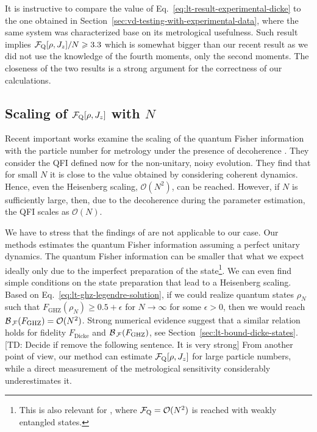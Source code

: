 It is instructive to compare the value of Eq.~\eqref{eq:lt-result-experimental-dicke} to the one obtained in Section~\ref{sec:vd-testing-with-experimental-data}, where the same system was characterized base on its metrological usefulness.
Such result implies $\mathcal{F}_{\textnormal{Q}}[{\textstyle \rho,J_z}]/N\geqslant3.3$ which is somewhat bigger than our recent result as we did not use the knowledge of the fourth moments, only the second moments.
The closeness of the two results is a strong argument for the correctness of our calculations.

\subsection{Scaling of $\mathcal{F}_{\textnormal{Q}}[{\textstyle \rho,J_z}]$ with $N$}

Recent important works examine the scaling of the quantum Fisher information with the particle number for metrology under the presence of decoherence \cite{Escher2011, Demkowicz-Dobrzanski2012}.
They consider the QFI defined now for the non-unitary, noisy evolution.
They find that for small $N$ it is close to the value obtained by considering coherent dynamics.
Hence, even the Heisenberg scaling, $\mathcal{O}(N^2)$, can be reached.
However, if $N$ is sufficiently large, then, due to the decoherence during the parameter estimation, the QFI scales as $\mathcal{O}(N)$.

We have to stress that the findings of \cite{Escher2011, Demkowicz-Dobrzanski2012} are not applicable to our case.
Our methods estimates the quantum Fisher information assuming a perfect unitary dynamics.
The quantum Fisher information can be smaller that what we expect ideally only due to the imperfect preparation of the state\footnote{
This is also relevant for \cite{Augusiak2015}, where $\mathcal{F}_{\textnormal{Q}}=\mathcal{O}(N^2)$ is reached with weakly entangled states.}.
We can even find simple conditions on the state preparation that lead to a Heisenberg scaling.
Based on Eq.~\eqref{eq:lt-ghz-legendre-solution}, if we could realize quantum states $\rho_N$ such that $F_{\text{GHZ}}(\rho_N)\geqslant0.5+\epsilon$ for $N\rightarrow\infty$ for some $\epsilon>0$, then we would reach $\mathcal{B}_{\, \mathcal{F} }(F_{\text{GHZ}}) = \mathcal{O}(N^2)$.
Strong numerical evidence suggest that a similar relation holds for fidelity $F_{\text{Dicke}}$ and $\mathcal{B}_{\, \mathcal{F} }(F_{\text{GHZ}})$, see Section~\ref{sec:lt-bound-dicke-states}.
[TD: Decide if remove the following sentence. It is very strong]
From another point of view, our method can estimate $\mathcal{F}_{\textnormal{Q}}[{\textstyle \rho,J_z}]$ for large particle numbers, while a direct measurement of the metrological sensitivity considerably underestimates it.
